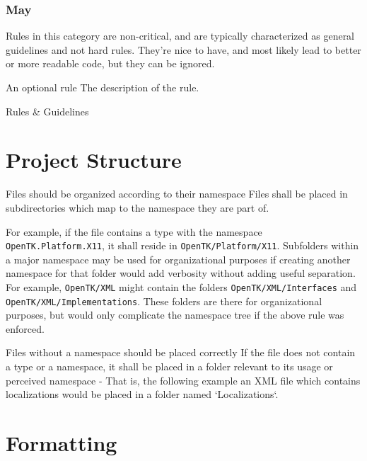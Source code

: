 \documentclass[11pt,a4paper]{article}
\newcounter{rule}[section]
\begin{document}
\subsubsection{May}
Rules in this category are non-critical, and are typically characterized as general guidelines and not hard rules. They're nice to have, and most likely lead to better or more readable code, but they can be ignored.

\begin{may}{An optional rule}
The description of the rule.
\end{may}

\pagebreak
\begin{center}
    \huge{Rules \& Guidelines}
\end{center}

\pagebreak
\section{Project Structure}
\begin{should}{Files should be organized according to their namespace}
Files shall be placed in subdirectories which map to the namespace they are part of. 
\end{should}

For example, if the file contains a type with the namespace\\ \texttt{OpenTK.Platform.X11}, it shall reside in \texttt{OpenTK/Platform/X11}. Subfolders within a major namespace may be used for organizational purposes if creating another namespace for that folder would add verbosity without adding useful separation. For example, \texttt{OpenTK/XML} might contain the folders \texttt{OpenTK/XML/Interfaces} and \texttt{OpenTK/XML/Implementations}. These folders are there for organizational purposes, but would only complicate the namespace tree if the above rule was enforced.

\begin{should}{Files without a namespace should be placed correctly}
If the file does not contain a type or a namespace, it shall be placed in a folder relevant to its usage or perceived namespace - That is, the following example an XML file which contains localizations would be placed in a folder named `Localizations`.
\end{should}

\section{Formatting}
\end{document}

